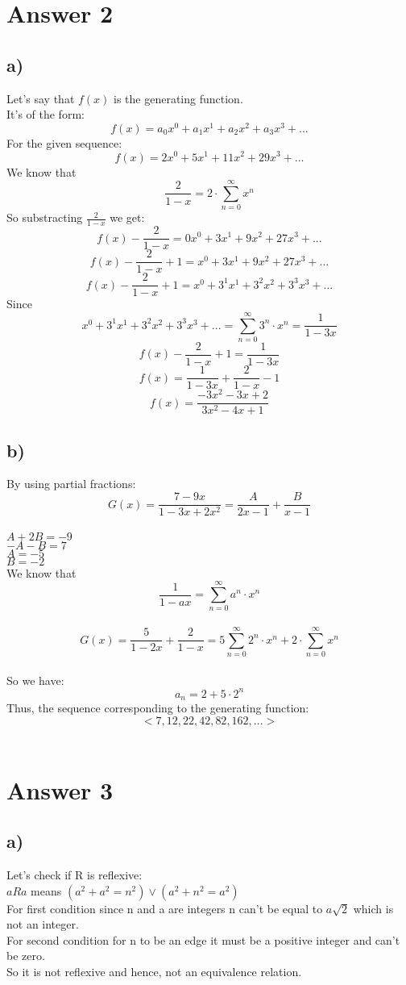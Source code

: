 \documentclass[12pt]{article}
\begin{document}
\section*{Answer 2}
\subsection*{a) }
Let's say that $f(x)$ is the generating function.\\
It's of the form:\\
$$f(x) = a_0x^0 + a_1x^1 + a_2x^2 + a_3x^3+...$$
For the given sequence:\\
$$f(x) = 2x^0 + 5x^1 + 11x^2 + 29x^3+...$$
We know that  $$\frac{2}{1-x} = 2 \cdot \sum_{n=0}^{\infty} x^n$$
So substracting $\frac{2}{1-x}$ we get:\\
$$f(x) - \frac{2}{1-x}= 0x^0 + 3x^1 + 9x^2 + 27x^3+...$$
$$f(x) - \frac{2}{1-x}+1= x^0 + 3x^1 + 9x^2 + 27x^3+...$$
$$f(x) - \frac{2}{1-x}+1= x^0 + 3^1x^1 + 3^2x^2 + 3^3x^3+...$$
Since $$x^0 + 3^1x^1 + 3^2x^2 + 3^3x^3+... = \sum_{n=0}^{\infty} 3^n \cdot x^n = \frac{1}{1-3x}$$
$$f(x) - \frac{2}{1-x}+1= \frac{1}{1-3x}$$
$$f(x) = \frac{1}{1-3x}+\frac{2}{1-x}-1 $$
$$f(x) = \frac{-3x^2 - 3x +2}{3x^2 - 4x +1} $$

\subsection*{b) }
By using partial fractions:\\
$$G(x) = \frac{7-9x}{1-3x+2x^2} = \frac{A}{2x-1}+\frac{B}{x-1}$$\\
$A + 2B = -9$\\
$-A - B = 7$\\
$A = -5 $\\
$ B = -2$\\
We know that  $$\frac{1}{1-ax} = \sum_{n=0}^{\infty}a^n \cdot x^n$$\\
$$G(x) = \frac{5}{1-2x}+\frac{2}{1-x} = 5\sum_{n=0}^{\infty} 2^n \cdot x^n + 2 \cdot\sum_{n=0}^{\infty} x^n $$\\
So we have:\\
$$a_n = 2 + 5\cdot 2^n$$
Thus, the sequence corresponding to the generating function:\\
$$< 7, 12, 22, 42, 82, 162, ... >$$\\


\section*{Answer 3}
\subsection*{a) }
Let's check if R is reflexive:\\
$aRa$ means $(a^2 +a^2 = n^2) \vee (a^2 + n^2 = a^2) $\\
For first condition since n and a are integers n can't be equal to $a\sqrt{2}$ which is not an integer.\\
For second condition for n to be an edge it must be a positive integer and can't be zero.\\
So it is not reflexive and hence, not an equivalence relation.
\end{document}
